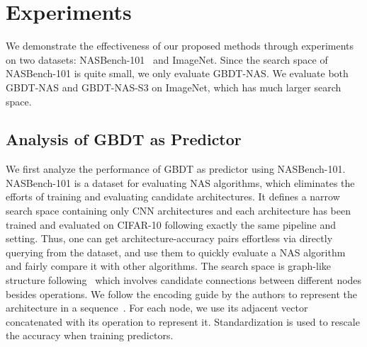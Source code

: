 \documentclass{article}
\begin{document}
\section{Experiments}
We demonstrate the effectiveness of our proposed methods through experiments on two datasets: NASBench-101~\cite{nasbench101} and ImageNet. Since the search space of NASBench-101 is quite small, we only evaluate GBDT-NAS. We evaluate both GBDT-NAS and GBDT-NAS-S3 on ImageNet, which has much larger search space.

\subsection{Analysis of GBDT as Predictor}
We first analyze the performance of GBDT as predictor using NASBench-101. NASBench-101 is a dataset for evaluating NAS algorithms, which eliminates the efforts of training and evaluating candidate architectures. It defines a narrow search space containing only  CNN architectures and each architecture has been trained and evaluated on CIFAR-10 following exactly the same pipeline and setting. Thus, one can get architecture-accuracy pairs effortless via directly querying from the dataset, and use them to quickly evaluate a NAS algorithm and fairly compare it with other algorithms. The search space is graph-like structure following~\cite{nasnet,enas,darts} which involves candidate connections between different nodes besides operations. We follow the encoding guide by the authors to represent the architecture in a sequence~\cite{nasbench101}. For each node, we use its adjacent vector concatenated with its operation to represent it. Standardization is used to rescale the accuracy when training predictors.
\end{document}
